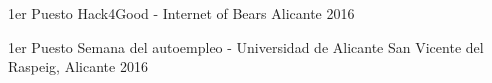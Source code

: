 
\begin{cvhonors}

  \cvhonor
    {1er Puesto} %
    {Hack4Good - Internet of Bears} %
    {Alicante} %
    {2016} %


  \cvhonor
    {1er Puesto} %
    {Semana del autoempleo - Universidad de Alicante} %
    {San Vicente del Raspeig, Alicante} %
    {2016} %


\end{cvhonors}
